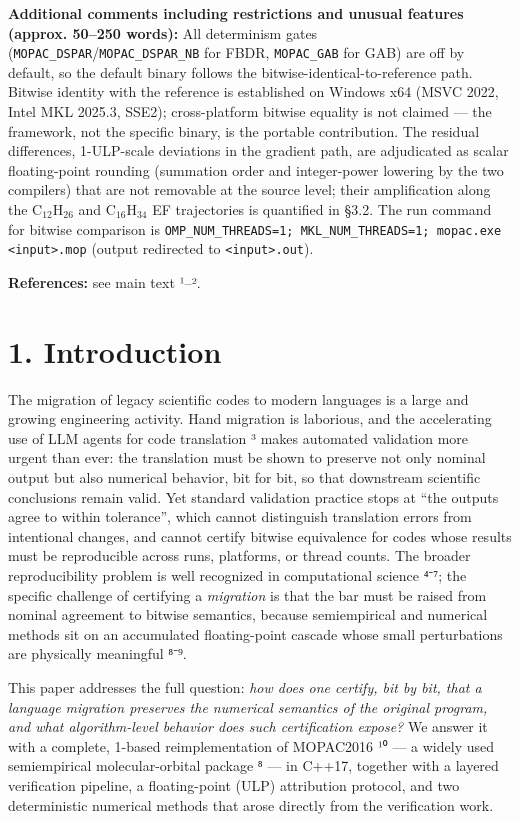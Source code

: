\documentclass[preprint,12pt]{elsarticle}
\begin{document}
\textbf{Additional comments including restrictions and unusual features (approx. 50--250 words):} All determinism gates (\texttt{MOPAC\_DSPAR}/\texttt{MOPAC\_DSPAR\_NB} for FBDR, \texttt{MOPAC\_GAB} for GAB) are off by default, so the default binary follows the bitwise-identical-to-reference path. Bitwise identity with the reference is established on Windows x64 (MSVC 2022, Intel MKL 2025.3, SSE2); cross-platform bitwise equality is not claimed --- the framework, not the specific binary, is the portable contribution. The residual differences, 1-ULP-scale deviations in the gradient path, are adjudicated as scalar floating-point rounding (summation order and integer-power lowering by the two compilers) that are not removable at the source level; their amplification along the C$_{12}$H$_{26}$ and C$_{16}$H$_{34}$ EF trajectories is quantified in \S{}3.2. The run command for bitwise comparison is \texttt{OMP\_NUM\_THREADS=1; MKL\_NUM\_THREADS=1; mopac.exe <input>.mop} (output redirected to \texttt{<input>.out}).

\textbf{References:} see main text ¹--².

\section{1. Introduction}

The migration of legacy scientific codes to modern languages is a large and growing engineering activity. Hand migration is laborious, and the accelerating use of LLM agents for code translation ³ makes automated validation more urgent than ever: the translation must be shown to preserve not only nominal output but also numerical behavior, bit for bit, so that downstream scientific conclusions remain valid. Yet standard validation practice stops at ``the outputs agree to within tolerance'', which cannot distinguish translation errors from intentional changes, and cannot certify bitwise equivalence for codes whose results must be reproducible across runs, platforms, or thread counts. The broader reproducibility problem is well recognized in computational science ⁴⁻⁷; the specific challenge of certifying a \textit{migration} is that the bar must be raised from nominal agreement to bitwise semantics, because semiempirical and numerical methods sit on an accumulated floating-point cascade whose small perturbations are physically meaningful ⁸⁻⁹.

This paper addresses the full question: \textit{how does one certify, bit by bit, that a language migration preserves the numerical semantics of the original program, and what algorithm-level behavior does such certification expose?} We answer it with a complete, 1-based reimplementation of MOPAC2016 ¹⁰ --- a widely used semiempirical molecular-orbital package ⁸ --- in C++17, together with a layered verification pipeline, a floating-point (ULP) attribution protocol, and two deterministic numerical methods that arose directly from the verification work.
\end{document}
